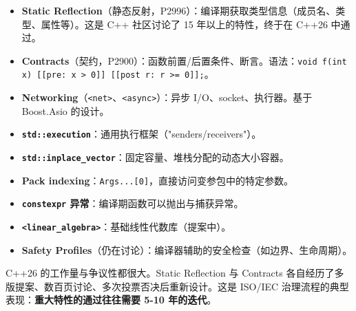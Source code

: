 \documentclass[12pt,a4paper,fontset=fandol]{ctexbook}
\newcommand{\kw}[1]{\texttt{#1}}
\begin{document}
\begin{itemize}
  \item \textbf{Static Reflection}（静态反射，P2996）：编译期获取类型信息（成员名、类型、属性等）。这是 C++ 社区讨论了 15 年以上的特性，终于在 C++26 中通过。
  \item \textbf{Contracts}（契约，P2900）：函数前置/后置条件、断言。语法：\kw{void f(int x) [[pre: x > 0]] [[post r: r >= 0]];}。
  \item \textbf{Networking}（\texttt{<net>}、\texttt{<async>}）：异步 I/O、socket、执行器。基于 Boost.Asio 的设计。
  \item \textbf{\kw{std::execution}}：通用执行框架（"senders/receivers"）。
  \item \textbf{\kw{std::inplace\_vector}}：固定容量、堆栈分配的动态大小容器。
  \item \textbf{Pack indexing}：\kw{Args...[0]}，直接访问变参包中的特定参数。
  \item \textbf{\kw{constexpr} 异常}：编译期函数可以抛出与捕获异常。
  \item \textbf{\kw{<linear\_algebra>}}：基础线性代数库（提案中）。
  \item \textbf{Safety Profiles}（仍在讨论）：编译器辅助的安全检查（如边界、生命周期）。
\end{itemize}

C++26 的工作量与争议性都很大。Static Reflection 与 Contracts 各自经历了多版提案、数百页讨论、多次投票否决后重新设计。这是 ISO/IEC 治理流程的典型表现：\textbf{重大特性的通过往往需要 5-10 年的迭代}。
\end{document}
